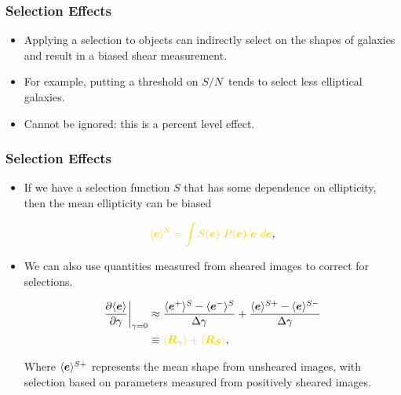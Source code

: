 \documentclass{beamer}
\newcommand{\mcalRg}{\mbox{\boldmath $R_\gamma$}}
\newcommand{\mcalRS}{\mbox{\boldmath $R_S$}}
\newcommand{\vest}{\mbox{\boldmath $e$}}
\newcommand{\snr}{$S/N$}
\begin{document}
\frame
{
    \frametitle{Selection Effects}

 

    \begin{itemize}

        \item  Applying a selection to objects can indirectly select on the shapes
            of galaxies and result in a biased shear measurement.

        \item For example, putting a threshold on \snr\ tends to select less
            elliptical galaxies.

        \item Cannot be ignored: this is a percent level effect.

    \end{itemize}

}

\frame
{
    \frametitle{Selection Effects}

 
    \begin{itemize}

        \item If we have a selection function $S$ that has some dependence
            on ellipticity, then the mean ellipticity
            can be biased

            \begin{align}
                {\color{gold} \langle \vest \rangle^S = \int S(\vest)~P(\vest)~\vest~d\vest},
            \end{align}


        \item We can also use quantities measured from sheared images
            to correct for selections. 

            \begin{align}
                \frac{\partial \langle \vest \rangle}{\partial \gamma}\bigg|_{\gamma=0} &\approx
                \frac{\langle \vest^+ \rangle^S - \langle \vest^- \rangle^S}{\Delta \gamma} + \frac{\langle \vest \rangle^{S+} - \langle \vest \rangle^{S-}}{\Delta \gamma} \nonumber \\
                &\equiv {\color{gold} \langle \mcalRg \rangle + \langle \mcalRS \rangle},
            \end{align}

            Where {\color{lightsteelblue} $\langle \vest \rangle^{S+}$}
            represents the mean shape from unsheared images, with selection
            based on parameters measured from
            positively sheared images.

    \end{itemize}

}
\end{document}

